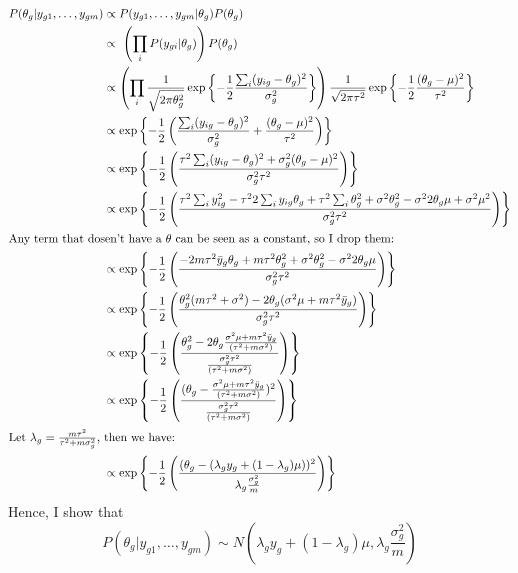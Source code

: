 \documentclass[paper=letter, fontsize=11pt]{scrartcl} %
\numberwithin{equation}{section} %
\numberwithin{figure}{section} %
\numberwithin{table}{section} %
\begin{document}
\subsection*{}
\begin{align*}
\begin{split}
P(\theta_g|y_{g1}, \dots, y_{gm}) &\propto P(y_{g1}, \dots, y_{gm}|\theta_g) P(\theta_g)\\
&\propto\ \left(\prod_i P(y_{gi}|\theta_g)\right) P(\theta_g)\\
&\propto \left( \prod_i \frac{1}{\sqrt{2\pi\theta_g^2}}\exp\left\{-\frac{1}{2}\frac{\sum_i(y_{ig}-\theta_g)^2}{\sigma_g^2} \right\}\right) \frac{1}{\sqrt{2\pi\tau^2}}\exp\left\{-\frac{1}{2}\frac{(\theta_g-\mu)^2}{\tau^2} \right\}\\
&\propto \exp\left\{-\frac{1}{2}\left(\frac{\sum_i(y_{ig}-\theta_g)^2}{\sigma_g^2}+\frac{(\theta_g-\mu)^2}{\tau^2} \right)\right\}\\
&\propto \exp\left\{-\frac{1}{2}\left(\frac{\tau^2\sum_i(y_{ig}-\theta_g)^2+\sigma_g^2(\theta_g-\mu)^2}{\sigma_g^2\tau^2} \right)\right\}\\	
&\propto \exp\left\{-\frac{1}{2}\left(\frac{\tau^2\sum_i y_{ig}^2-\tau^22\sum_iy_{ig}\theta_g + \tau^2\sum_i\theta_g^2+\sigma^2\theta_g^2 - \sigma^22\theta_g\mu + \sigma^2\mu^2}{\sigma_g^2\tau^2} \right)\right\}\\
\intertext{Any term that dosen't have a $\theta$ can be seen as a constant, so I drop them:}	
&\propto \exp\left\{-\frac{1}{2}\left(\frac{-2m\tau^2\bar{y}_g\theta_g + m\tau^2\theta_g^2+\sigma^2\theta_g^2 - \sigma^22\theta_g\mu}{\sigma_g^2\tau^2} \right)\right\}\\
&\propto \exp\left\{-\frac{1}{2}\left(\frac{\theta_g^2(m\tau^2+\sigma^2) - 2\theta_g(\sigma^2\mu + m\tau^2\bar{y}_g)}{\sigma_g^2\tau^2} \right)\right\}\\
&\propto \exp\left\{-\frac{1}{2}\left(\frac{\theta_g^2 - 2\theta_g\frac{\sigma^2\mu + m\tau^2\bar{y}_g}{(\tau^2+m\sigma^2)}}{\frac{\sigma_g^2\tau^2}{(\tau^2+m\sigma^2)}} \right)\right\}\\
&\propto \exp\left\{-\frac{1}{2}\left(\frac{(\theta_g - \frac{\sigma^2\mu + m\tau^2\bar{y}_g}{(\tau^2+m\sigma^2)})^2}{\frac{\sigma_g^2\tau^2}{(\tau^2+m\sigma^2)}} \right)\right\}\\
\intertext{Let $\lambda_g = \frac{m\tau^2}{\tau^2+m\sigma_g^2}$, then we have:}	
&\propto \exp\left\{-\frac{1}{2}\left(\frac{(\theta_g -(\lambda_g y_g + (1-\lambda_g)\mu))^2}{\lambda_g\frac{\sigma_g^2}{m}} \right)\right\}\\
\end{split}
\end{align*}
Hence, I show that
\[
P(\theta_g|y_{g1}, \dots, y_{gm}) \sim N(\lambda_g y_g + (1-\lambda_g)\mu,\lambda_g\frac{\sigma_g^2}{m})
\]
\end{document}
